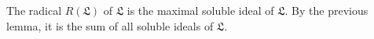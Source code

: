 The radical $R(\mathfrak{L})$ of $\mathfrak{L}$ is the maximal soluble ideal
of $\mathfrak{L}$. By the previous lemma, it is the sum of all soluble ideals
of $\mathfrak{L}$.

